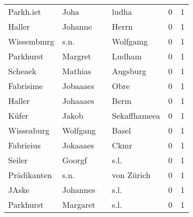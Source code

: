 \begin{center}
\begin{tiny}
\begin{longtabu}{llllrr}
                Parkh.iet &                               Joha &             &                                       ludha &          0 &         1 \\
                   Haller &                            Johanne &             &                                       Herrn &          0 &         1 \\
               Wissembmrg &                               s.n. &             &                                    Wolfgamg &          0 &         1 \\
                Parkhurst &                            Margret &             &                                      Ludham &          0 &         1 \\
                  Scheaek &                            Mathias &             &                                    Augsburg &          0 &         1 \\
                Fabrisime &                           Jobaaaes &             &                                        Obre &          0 &         1 \\
                   Haller &                           Johaaaes &             &                                        Berm &          0 &         1 \\
                    Küfer &                              Jakob &             &                                Sekaffhameea &          0 &         1 \\
               Wisseaburg &                           Wolfgang &             &                                       Basel &          0 &         1 \\
                Fabrieius &                           Jokaaaes &             &                                        Ckmr &          0 &         1 \\
                   Seiler &                             Goorgf &             &                                        s.l. &          0 &         1 \\
              Prädikanten &                               s.n. &             &                                  von Zürich &          0 &         1 \\
                    JAske &                           Johannes &             &                                        s.l. &          0 &         1 \\
                Parkhurst &                           Margaret &             &                                        s.l. &          0 &         1 \\

\end{longtabu}
\end{tiny}
\end{center}
